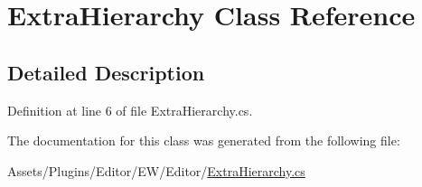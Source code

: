 \hypertarget{class_extra_hierarchy}{}\section{Extra\+Hierarchy Class Reference}
\label{class_extra_hierarchy}


\subsection{Detailed Description}


Definition at line 6 of file Extra\+Hierarchy.\+cs.



The documentation for this class was generated from the following file\+:\begin{DoxyCompactItemize}
\item 
Assets/\+Plugins/\+Editor/\+E\+W/\+Editor/\mbox{\hyperlink{_extra_hierarchy_8cs}{Extra\+Hierarchy.\+cs}}\end{DoxyCompactItemize}
